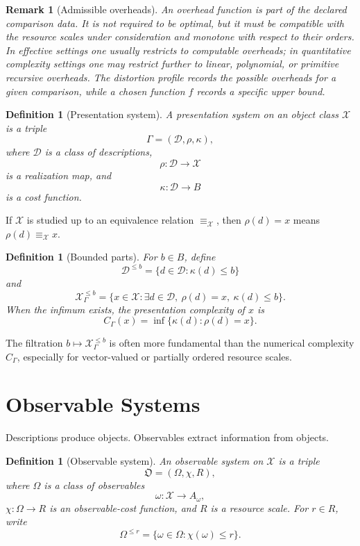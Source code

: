 \documentclass[11pt]{article}
\newtheorem{definition}[theorem]{Definition}
\newtheorem{remark}[theorem]{Remark}
\begin{document}
\begin{remark}[Admissible overheads]
An overhead function is part of the declared comparison data. It is not required to be optimal, but it must be compatible with the resource scales under consideration and monotone with respect to their orders. In effective settings one usually restricts to computable overheads; in quantitative complexity settings one may restrict further to linear, polynomial, or primitive recursive overheads. The distortion profile records the possible overheads for a given comparison, while a chosen function \(f\) records a specific upper bound.
\end{remark}

\begin{definition}[Presentation system]
A presentation system on an object class \(\mathcal X\) is a triple
\[
\Gamma=(\mathcal D,\rho,\kappa),
\]
where \(\mathcal D\) is a class of descriptions,
\[
\rho:\mathcal D\to\mathcal X
\]
is a realization map, and
\[
\kappa:\mathcal D\to B
\]
is a cost function.
\end{definition}

If \(\mathcal X\) is studied up to an equivalence relation \(\equiv_\mathcal X\), then \(\rho(d)=x\) means \(\rho(d)\equiv_\mathcal X x\).

\begin{definition}[Bounded parts]
For \(b\in B\), define
\[
\mathcal D^{\leq b}=\{d\in\mathcal D:\kappa(d)\leq b\}
\]
and
\[
\mathcal X_\Gamma^{\leq b}
=
\{x\in\mathcal X:\exists d\in\mathcal D,\ \rho(d)=x,\ \kappa(d)\leq b\}.
\]
When the infimum exists, the presentation complexity of \(x\) is
\[
C_\Gamma(x)=\inf\{\kappa(d):\rho(d)=x\}.
\]
\end{definition}

The filtration \(b\mapsto \mathcal X_\Gamma^{\leq b}\) is often more fundamental than the numerical complexity \(C_\Gamma\), especially for vector-valued or partially ordered resource scales.

\section{Observable Systems}

Descriptions produce objects. Observables extract information from objects.

\begin{definition}[Observable system]
An observable system on \(\mathcal X\) is a triple
\[
\mathfrak O=(\Omega,\chi,R),
\]
where \(\Omega\) is a class of observables
\[
\omega:\mathcal X\to A_\omega,
\]
\(\chi:\Omega\to R\) is an observable-cost function, and \(R\) is a resource scale. For \(r\in R\), write
\[
\Omega^{\leq r}=\{\omega\in\Omega:\chi(\omega)\leq r\}.
\]
\end{definition}
\end{document}

